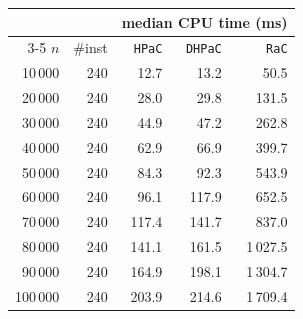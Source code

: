\begin{tabular}{@{}rrrrr@{}}
\toprule
 &  & \multicolumn{3}{c}{median CPU time (ms)} \\
\cmidrule(l){3-5}
$n$ & \#inst & \texttt{HPaC} & \texttt{DHPaC} & \texttt{RaC} \\
\midrule
10\,000 & 240 & 12.7 & 13.2 & 50.5 \\
20\,000 & 240 & 28.0 & 29.8 & 131.5 \\
30\,000 & 240 & 44.9 & 47.2 & 262.8 \\
40\,000 & 240 & 62.9 & 66.9 & 399.7 \\
50\,000 & 240 & 84.3 & 92.3 & 543.9 \\
60\,000 & 240 & 96.1 & 117.9 & 652.5 \\
70\,000 & 240 & 117.4 & 141.7 & 837.0 \\
80\,000 & 240 & 141.1 & 161.5 & 1\,027.5 \\
90\,000 & 240 & 164.9 & 198.1 & 1\,304.7 \\
100\,000 & 240 & 203.9 & 214.6 & 1\,709.4 \\
\bottomrule
\end{tabular}
